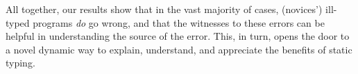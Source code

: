 \smallskip
All together, our results show that in the vast majority of cases, (novices') ill-typed
programs \emph{do} go wrong, and that the witnesses to these errors can be
helpful in understanding the source of the error. This, in turn, opens the
door to a novel dynamic way to explain, understand, and appreciate the
benefits of static typing.


